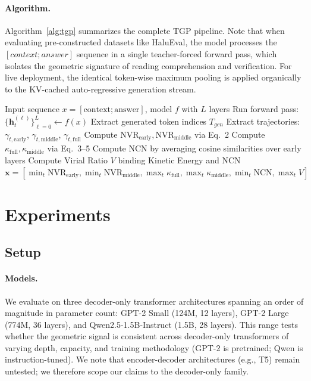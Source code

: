 \documentclass[10pt]{article}
\newcommand{\tgp}{\textsc{TGP}\xspace}
\newcommand{\nvr}{\text{NVR}}
\begin{document}
\paragraph{Algorithm.}
Algorithm~\ref{alg:tgp} summarizes the complete \tgp pipeline. Note that when evaluating pre-constructed datasets like HaluEval, the model processes the $[context; answer]$ sequence in a single teacher-forced forward pass, which isolates the geometric signature of reading comprehension and verification. For live deployment, the identical token-wise maximum pooling is applied organically to the KV-cached auto-regressive generation stream.
\begin{algorithm}[t]
\caption{Trajectory Geometry Probe (\tgp)}
\label{alg:tgp}
\begin{algorithmic}[1]
\REQUIRE Input sequence $x = [\text{context}; \text{answer}]$, model $f$ with $L$ layers
\STATE Run forward pass: $\{\mathbf{h}_t^{(\ell)}\}_{\ell=0}^{L} \leftarrow f(x)$
\STATE Extract generated token indices $T_{gen}$
    \STATE Extract trajectories: $\gamma_{t, \text{early}}$, $\gamma_{t, \text{middle}}$, $\gamma_{t, \text{full}}$
    \STATE Compute $\nvr_{\text{early}}, \nvr_{\text{middle}}$ via Eq.~2
    \STATE Compute $\kappa_{\text{full}}, \kappa_{\text{middle}}$ via Eq.~3--5
    \STATE Compute NCN by averaging cosine similarities over early layers
    \STATE Compute Virial Ratio $V$ binding Kinetic Energy and NCN
\ENDFOR
\RETURN $\mathbf{x} = [\min_t \nvr_{\text{early}}, \min_t \nvr_{\text{middle}}, \max_t \kappa_{\text{full}}, \max_t \kappa_{\text{middle}}, \min_t \text{NCN}, \max_t V]$
\end{algorithmic}
\end{algorithm}

\section{Experiments}
\label{sec:experiments}

\subsection{Setup}

\paragraph{Models.}
We evaluate on three decoder-only transformer architectures spanning an order of magnitude in parameter count:
GPT-2 Small (124M, 12 layers), GPT-2 Large (774M, 36 layers), and Qwen2.5-1.5B-Instruct (1.5B, 28 layers).
This range tests whether the geometric signal is consistent across decoder-only transformers of varying depth, capacity, and training methodology (GPT-2 is pretrained; Qwen is instruction-tuned).
We note that encoder-decoder architectures (e.g., T5) remain untested; we therefore scope our claims to the decoder-only family.
\end{document}
